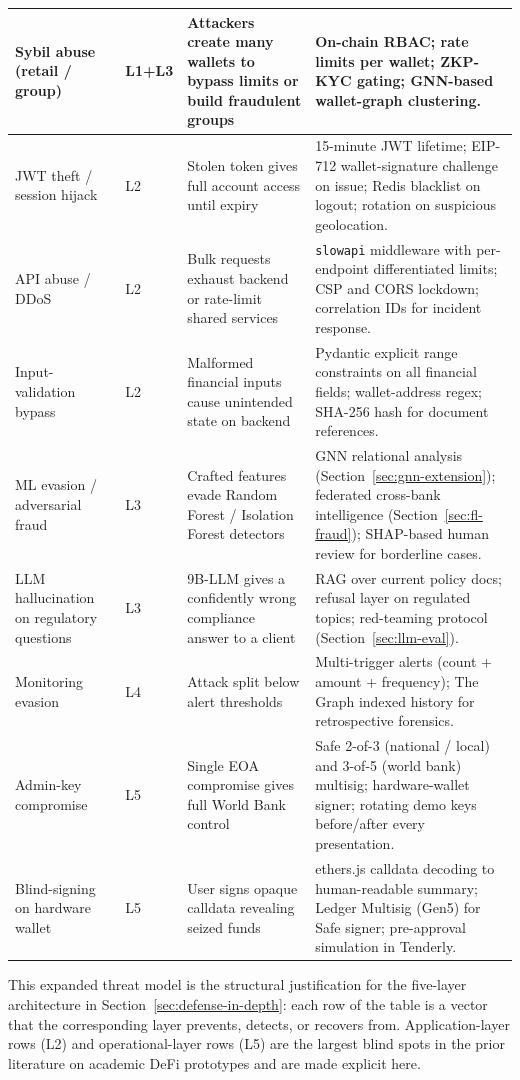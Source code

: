 \documentclass[12pt,a4paper]{report}
\begin{document}
\begin{table}[H]
\begin{tabular}{p{2.6cm}p{2.0cm}p{4.5cm}p{4.8cm}}
\hline
Sybil abuse (retail / group) & L1+L3 & Attackers create many wallets to bypass limits or build fraudulent groups & On-chain RBAC; rate limits per wallet; ZKP-KYC gating; GNN-based wallet-graph clustering. \\
\hline
JWT theft / session hijack & L2 & Stolen token gives full account access until expiry & 15-minute JWT lifetime; EIP-712 wallet-signature challenge on issue; Redis blacklist on logout; rotation on suspicious geolocation. \\
\hline
API abuse / DDoS & L2 & Bulk requests exhaust backend or rate-limit shared services & \texttt{slowapi} middleware with per-endpoint differentiated limits; CSP and CORS lockdown; correlation IDs for incident response. \\
\hline
Input-validation bypass & L2 & Malformed financial inputs cause unintended state on backend & Pydantic explicit range constraints on all financial fields; wallet-address regex; SHA-256 hash for document references. \\
\hline
ML evasion / adversarial fraud & L3 & Crafted features evade Random Forest / Isolation Forest detectors & GNN relational analysis (Section~\ref{sec:gnn-extension}); federated cross-bank intelligence (Section~\ref{sec:fl-fraud}); SHAP-based human review for borderline cases. \\
\hline
LLM hallucination on regulatory questions & L3 & 9B-LLM gives a confidently wrong compliance answer to a client & RAG over current policy docs; refusal layer on regulated topics; red-teaming protocol (Section~\ref{sec:llm-eval}). \\
\hline
Monitoring evasion & L4 & Attack split below alert thresholds & Multi-trigger alerts (count + amount + frequency); The Graph indexed history for retrospective forensics. \\
\hline
Admin-key compromise & L5 & Single EOA compromise gives full World Bank control & Safe 2-of-3 (national / local) and 3-of-5 (world bank) multisig; hardware-wallet signer; rotating demo keys before/after every presentation. \\
\hline
Blind-signing on hardware wallet & L5 & User signs opaque calldata revealing seized funds & ethers.js calldata decoding to human-readable summary; Ledger Multisig (Gen5) for Safe signer; pre-approval simulation in Tenderly. \\
\hline
\end{tabular}
\end{table}

This expanded threat model is the structural justification for the five-layer architecture in Section~\ref{sec:defense-in-depth}: each row of the table is a vector that the corresponding layer prevents, detects, or recovers from. Application-layer rows (L2) and operational-layer rows (L5) are the largest blind spots in the prior literature on academic DeFi prototypes and are made explicit here.
\end{document}
